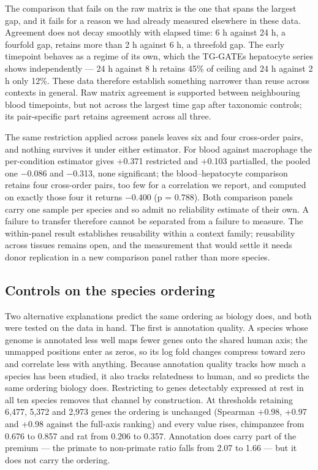 \documentclass[11pt,a4paper]{article}
\begin{document}
The comparison that fails on the raw matrix is the one that spans the
largest gap, and it fails for a reason we had already measured elsewhere
in these data. Agreement does not decay smoothly with elapsed time: 6 h
against 24 h, a fourfold gap, retains more than 2 h against 6 h, a
threefold gap. The early timepoint behaves as a regime of its own, which
the TG-GATEs hepatocyte series shows independently --- 24 h against 8 h
retains 45\% of ceiling and 24 h against 2 h only 12\%. These data
therefore establish something narrower than reuse across contexts in
general. Raw matrix agreement is supported between neighbouring blood
timepoints, but not across the largest time gap after taxonomic
controls; its pair-specific part retains agreement across all three.

The same restriction applied across panels leaves six and four
cross-order pairs, and nothing survives it under either estimator. For
blood against macrophage the per-condition estimator gives +0.371
restricted and +0.103 partialled, the pooled one −0.086 and −0.313, none
significant; the blood--hepatocyte comparison retains four cross-order
pairs, too few for a correlation we report, and computed on exactly
those four it returns −0.400 (p = 0.788). Both comparison panels carry
one sample per species and so admit no reliability estimate of their
own. A failure to transfer therefore cannot be separated from a failure
to measure. The within-panel result establishes reusability within a
context family; reusability across tissues remains open, and the
measurement that would settle it needs donor replication in a new
comparison panel rather than more species.

\subsection{Controls on the species
ordering}\label{controls-on-the-species-ordering}

Two alternative explanations predict the same ordering as biology does,
and both were tested on the data in hand. The first is annotation
quality. A species whose genome is annotated less well maps fewer genes
onto the shared human axis; the unmapped positions enter as zeros, so
its log fold changes compress toward zero and correlate less with
anything. Because annotation quality tracks how much a species has been
studied, it also tracks relatedness to human, and so predicts the same
ordering biology does. Restricting to genes detectably expressed at rest
in all ten species removes that channel by construction. At thresholds
retaining 6,477, 5,372 and 2,973 genes the ordering is unchanged
(Spearman +0.98, +0.97 and +0.98 against the full-axis ranking) and
every value rises, chimpanzee from 0.676 to 0.857 and rat from 0.206 to
0.357. Annotation does carry part of the premium --- the primate to
non-primate ratio falls from 2.07 to 1.66 --- but it does not carry the
ordering.
\end{document}
